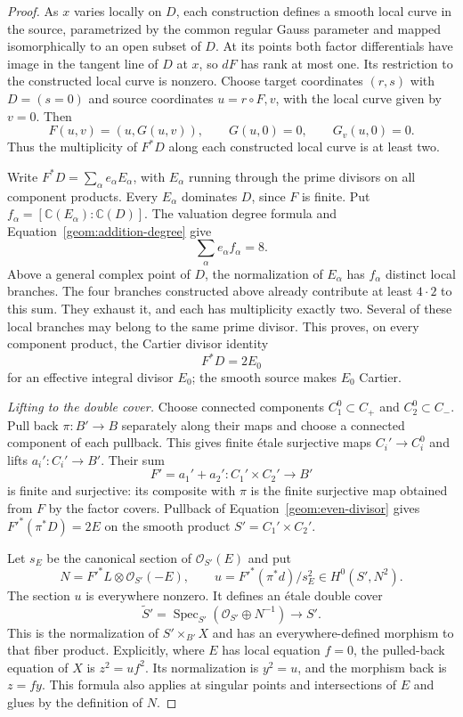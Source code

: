 \documentclass[11pt]{amsart}
\newcommand{\C}{\mathbb C}
\theoremstyle{definition}
\theoremstyle{remark}
\numberwithin{equation}{section}
\begin{document}
\begin{proof}
As $x$ varies locally on $D$, each construction defines a smooth
local curve in the source, parametrized by the common regular Gauss
parameter and mapped isomorphically to an open subset of $D$.
At its points both factor differentials have image in the tangent
line of $D$ at $x$, so $dF$ has rank at most one.  Its restriction
to the constructed local curve is nonzero.  Choose target coordinates
$(r,s)$ with $D=(s=0)$ and source coordinates $u=r\circ F,v$, with
the local curve given by $v=0$.  Then
\[
 F(u,v)=(u,G(u,v)),\qquad G(u,0)=0,\qquad G_v(u,0)=0.
\]
Thus the multiplicity of $F^*D$ along each constructed local curve
is at least two.

Write $F^*D=\sum_\alpha e_\alpha E_\alpha$, with $E_\alpha$
running through the prime divisors on all component products.
Every $E_\alpha$ dominates $D$, since $F$ is finite.  Put
$f_\alpha=[\C(E_\alpha):\C(D)]$.  The valuation degree formula
and Equation~\eqref{geom:addition-degree} give
\[
 \sum_\alpha e_\alpha f_\alpha=8.
\]
Above a general complex point of $D$, the normalization of
$E_\alpha$ has $f_\alpha$ distinct local branches.  The four
branches constructed above already contribute at least $4\cdot2$
to this sum.  They exhaust it, and each has multiplicity exactly
two.  Several of these local branches may belong to the same prime
divisor.  This proves, on every component product, the Cartier
divisor identity
\begin{equation}\label{geom:even-divisor}
 F^*D=2E_0
\end{equation}
for an effective integral divisor $E_0$; the smooth source makes
$E_0$ Cartier.

\smallskip\noindent
\emph{Lifting to the double cover.}
Choose connected components $C_1^0\subset C_+$ and
$C_2^0\subset C_-$.  Pull back $\pi:B'\to B$ separately along
their maps and choose a connected component of each pullback.  This
gives finite \'{e}tale surjective maps $C_i'\to C_i^0$ and lifts
$a_i':C_i'\to B'$.  Their sum
\[
 F'=a_1'+a_2':C_1'\times C_2'\longrightarrow B'
\]
is finite and surjective: its composite with $\pi$ is the finite
surjective map obtained from $F$ by the factor covers.  Pullback of
Equation~\eqref{geom:even-divisor} gives $F'^*(\pi^*D)=2E$ on the
smooth product $S'=C_1'\times C_2'$.

Let $s_E$ be the canonical section of $\mathcal O_{S'}(E)$ and put
\[
 N=F'^*L\otimes\mathcal O_{S'}(-E),\qquad
 u=F'^*(\pi^*d)/s_E^2\in H^0(S',N^2).
\]
The section $u$ is everywhere nonzero.  It defines an \'{e}tale
double cover
\[
 \widetilde S'=\operatorname{Spec}_{S'}
        (\mathcal O_{S'}\oplus N^{-1})\longrightarrow S'.
\]
This is the normalization of $S'\times_{B'}X$ and has an
everywhere-defined morphism to that fiber product.  Explicitly,
where $E$ has local equation $f=0$, the pulled-back equation of $X$
is $z^2=uf^2$.  Its normalization is $y^2=u$, and the morphism back
is $z=fy$.  This formula also applies at singular points and
intersections of $E$ and glues by the definition of $N$.


\end{proof}
\end{document}
